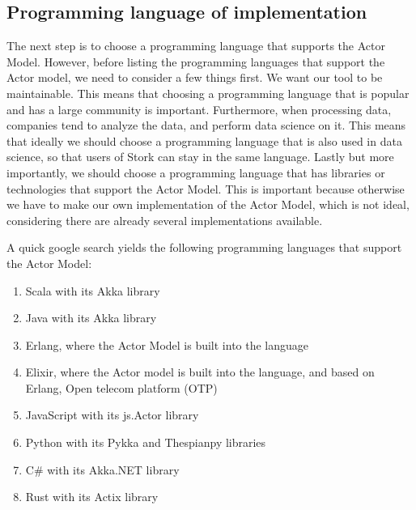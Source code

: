 \documentclass[a4paper]{article}
\begin{document}
\subsection{Programming language of implementation}
The next step is to choose a programming language that supports the Actor Model. However, before listing the programming languages that support the Actor model, we need to consider a few things first. We want our tool to be maintainable. This means that choosing a programming language that is popular and has a large community is important. Furthermore, when processing data, companies tend to analyze the data, and perform data science on it. This means that ideally we should choose a programming language that is also used in data science, so that users of Stork can stay in the same language. Lastly but more importantly, we should choose a programming language that has libraries or technologies that support the Actor Model. This is important because otherwise we have to make our own implementation of the Actor Model, which is not ideal, considering there are already several implementations available.

A quick google search yields the following programming languages that support the Actor Model:
\begin{enumerate}
    \item Scala with its Akka library
    \item Java with its Akka library
    \item Erlang, where the Actor Model is built into the language
    \item Elixir, where the Actor model is built into the language, and based on Erlang, Open telecom platform (OTP)
    \item JavaScript with its js.Actor library
    \item Python with its Pykka and Thespianpy libraries
    \item C\# with its Akka.NET library
    \item Rust with its Actix library
\end{enumerate}
\end{document}
